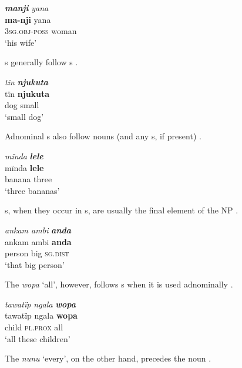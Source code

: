 \ea%
    \label{ex:overview:16}
    \textbf{\textit{manji}} \textit{yana}\\
\gll    \textbf{ma-nji}      yana\\
    3\textsc{sg.obj-poss}  woman\\
\glt    ‘his wife’
\z

s generally follow s .

\ea%
    \label{ex:overview:17}
    \textit{tïn} \textbf{\textit{njukuta}}\\
\gll tïn    \textbf{njukuta}\\
    dog  small\\
\glt    ‘small dog’
\z

Adnominal s also follow nouns (and any s, if present) .

\ea%
    \label{ex:overview:18}
    \textit{mïnda} \textbf{\textit{lele}}\\
\gll    mïnda    \textbf{lele}\\
    banana    three\\
\glt    ‘three bananas’
\z

s, when they occur in s, are usually the final element of the NP .

\ea%
    \label{ex:overview:19}
    \textit{ankam ambi} \textbf{\textit{anda}}\\
\gll    ankam  ambi  \textbf{anda}\\
    person  big    \textsc{sg.dist}\\
\glt    ‘that big person’
\z

The  \textit{wopa} ‘all’, however, follows s when it is used adnominally .


\ea%
    \label{ex:overview:20}
    \textit{tawatïp ngala} \textbf{\textit{wopa}}\\
\gll    tawatïp    ngala    \textbf{wopa}\\
    child    \textsc{pl.prox}  all\\
\glt    ‘all these children’
\z

The  \textit{nunu} ‘every’, on the other hand, precedes the noun .


